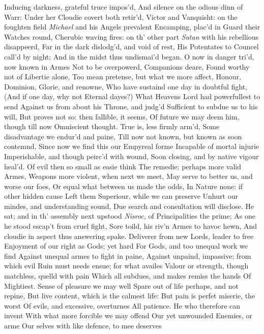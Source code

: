 \documentclass[11pt]{book}
\begin{document}
Inducing darkness, grateful truce impos'd, 
And silence on the odious dinn of Warr: 
Under her Cloudie covert both retir'd, 
Victor and Vanquisht: on the foughten field 
\textit{Michael} and his Angels prevalent 
Encamping, plac'd in Guard their Watches round, 
Cherubic waving fires: on th' other part 
\textit{Satan} with his rebellious disappeerd, 
Far in the dark dislodg'd, and void of rest, 
His Potentates to Councel call'd by night; 
And in the midst thus undismai'd began. 
\quad O now in danger tri'd, now known in Armes 
Not to be overpowerd, Companions deare, 
Found worthy not of Libertie alone, 
Too mean pretense, but what we more affect, 
Honour, Dominion, Glorie, and renowne, 
Who have sustaind one day in doubtful fight, 
(And if one day, why not Eternal dayes?) 
What Heavens Lord had powerfullest to send 
Against us from about his Throne, and judg'd 
Sufficient to subdue us to his will, 
But proves not so: then fallible, it seems, 
Of future we may deem him, though till now 
Omniscient thought.  True is, less firmly arm'd, 
Some disadvantage we endur'd and paine, 
Till now not known, but known as soon contemnd, 
Since now we find this our Empyreal forme 
Incapable of mortal injurie 
Imperishable, and though peirc'd with wound, 
Soon closing, and by native vigour heal'd. 
Of evil then so small as easie think 
The remedie; perhaps more valid Armes, 
Weapons more violent, when next we meet, 
May serve to better us, and worse our foes, 
Or equal what between us made the odds, 
In Nature none: if other hidden cause 
Left them Superiour, while we can preserve 
Unhurt our mindes, and understanding sound, 
Due search and consultation will disclose. 
\quad He sat; and in th' assembly next upstood 
\textit{Nisroc}, of Principalities the prime; 
As one he stood escap't from cruel fight, 
Sore toild, his riv'n Armes to havoc hewn, 
And cloudie in aspect thus answering spake. 
Deliverer from new Lords, leader to free 
Enjoyment of our right as Gods; yet hard 
For Gods, and too unequal work we find 
Against unequal armes to fight in paine, 
Against unpaind, impassive; from which evil 
Ruin must needs ensue; for what availes 
Valour or strength, though matchless, quelld with pain 
Which all subdues, and makes remiss the hands 
Of Mightiest.  Sense of pleasure we may well 
Spare out of life perhaps, and not repine, 
But live content, which is the calmest life: 
But pain is perfet miserie, the worst 
Of evils, and excessive, overturnes 
All patience.  He who therefore can invent 
With what more forcible we may offend 
Our yet unwounded Enemies, or arme 
Our selves with like defence, to mee deserves 
\end{document}
